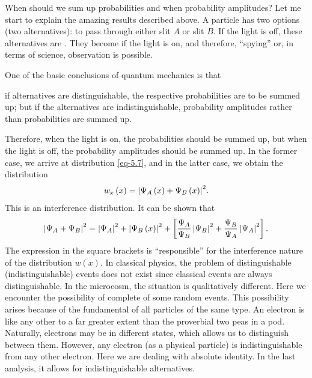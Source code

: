When should we sum up probabilities and when probability amplitudes? Let me start to explain the amazing results described above. A particle has two options (two alternatives): to pass through either slit $A$ or slit $B$. If the light is off, these alternatives are . They become  if the light is on, and therefore, ``spying'' or, in terms of science, observation is possible.

One of the basic conclusions of quantum mechanics is that 
\begin{mybox}{}
if alternatives are distinguishable, the respective probabilities are to be
summed up; but if the alternatives are indistinguishable, probability
amplitudes rather than probabilities are summed up. 
\end{mybox}
Therefore, when the light is on, the probabilities should be summed up, but when the light is off, the probability amplitudes should be summed up. In the former
case, we arrive at distribution \eqref{eq-5.7}, and in the latter case, we obtain the distribution
\begin{equation}%
w_{x} \, (x) =  \abs{\Psi_{A} \, (x) +  \Psi_{B} \, (x)}^{2}.
\label{eq-5.8}
\end{equation}
This is an interference distribution. It can be shown that
\begin{equation}%
 \abs{\Psi_{A} +  \Psi_{B}}^{2} =  \abs{\Psi_{A}}^{2} +  \abs{\Psi_{B} \, (x)}^{2} + \left[ \frac{\Psi_{A}}{\Psi_{B}} \,\abs{\Psi_{B}}^{2} + \frac{\Psi_{B}}{\Psi_{A}}\, \abs{\Psi_{A}}^{2} \right].
\label{eq-5.9}
\end{equation}
The expression in the square brackets is ``responsible'' for the
interference nature of the distribution $w(x)$. In classical physics, the
problem of distinguishable (indistinguishable) events does not exist since
classical events are always distinguishable. In the microcosm, the
situation is qualitatively different. Here we encounter the possibility of
complete  of some random events. This possibility arises because of the fundamental  of all particles of the same type. An electron is like any other to a far greater extent than the proverbial two peas in a pod. Naturally, electrons may be in different
states, which allows us to distinguish between them. However, any
electron (as a physical particle) is indistinguishable from any other
electron. Here we are dealing with absolute identity. In the last analysis,
it allows for indistinguishable alternatives. 

